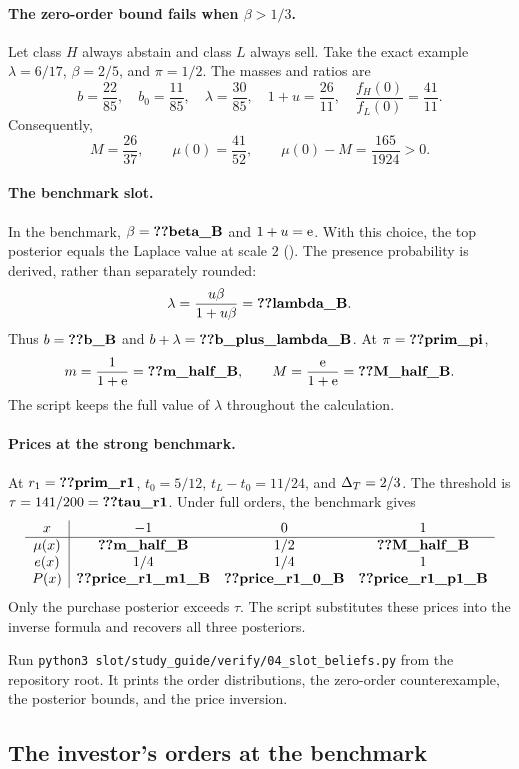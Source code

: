 \paragraph{The zero-order bound fails when \texorpdfstring{$\beta>1/3$}{beta > 1/3}.}
Let class $H$ always abstain and class $L$ always sell.
Take the exact example $\lambda=6/17$, $\beta=2/5$, and $\pi=1/2$.
The masses and ratios are
\[
b=\frac{22}{85},\quad b_0=\frac{11}{85},\quad
\lambda=\frac{30}{85},\quad
1+u=\frac{26}{11},\quad \frac{f_H(0)}{f_L(0)}=\frac{41}{11}.
\]
Consequently,
\[
M=\frac{26}{37},\qquad \mu(0)=\frac{41}{52},\qquad
\mu(0)-M=\frac{165}{1924}>0.
\]

\paragraph{The benchmark slot.}
In the benchmark, $\beta=\reg{beta_B}$ and $1+u=\mathrm{e}$.
With this choice, the top posterior equals the Laplace value at scale $2$ ().
The presence probability is derived, rather than separately rounded:
\[
\lambda=\frac{u\beta}{1+u\beta}=\reg{lambda_B}.
\]
Thus $b=\reg{b_B}$ and $b+\lambda=\reg{b_plus_lambda_B}$.
At $\pi=\reg{prim_pi}$,
\[
m=\frac1{1+\eu}=\reg{m_half_B},\qquad
M=\frac{\eu}{1+\eu}=\reg{M_half_B}.
\]
The script keeps the full value of $\lambda$ throughout the calculation.

\paragraph{Prices at the strong benchmark.}
At $r_1=\reg{prim_r1}$, $t_0=5/12$, $t_L-t_0=11/24$, and $\Delta_T=2/3$.
The threshold is $\tau=141/200=\reg{tau_r1}$.
Under full orders, the benchmark gives
\[
\begin{array}{c|ccc}
x&-1&0&1\\ \hline
\mu(x)&\reg{m_half_B}&1/2&\reg{M_half_B}\\
e(x)&1/4&1/4&1\\
P(x)&\reg{price_r1_m1_B}&\reg{price_r1_0_B}&\reg{price_r1_p1_B}
\end{array}
\]
Only the purchase posterior exceeds $\tau$.
The script substitutes these prices into the inverse formula and recovers all three posteriors.

Run \texttt{python3 slot/study\_guide/verify/04\_slot\_beliefs.py} from the repository root.
It prints the order distributions, the zero-order counterexample, the posterior bounds, and the price inversion.

\subsection{The investor's orders at the benchmark}\label{sec:benchmark-investor}

